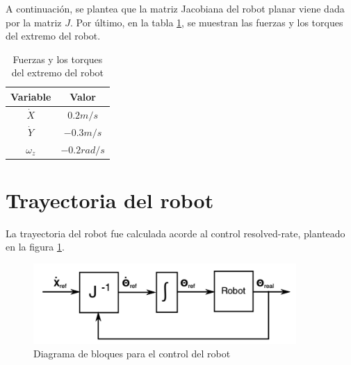 \documentclass[11pt]{report} %
\begin{document}
	A continuación, se plantea que la matriz Jacobiana del robot planar viene dada por la matriz $J$. Por último, en la tabla \ref{Tabla: Fuerzas}, se muestran las fuerzas y los torques del extremo del robot.
%



	\begin{table}[H]
		\centering
		\begin{tabular}{|c|c|}
			\hline
			\textbf{Variable}  & \textbf{Valor}  \\ \hline
			$\dot{X}$          & $0.2  m/s  $    \\ \hline
			$\dot{Y}$          & $-0.3 m/s  $    \\ \hline
			${\omega}_{z}$     & $-0.2 rad/s$    \\ \hline
		\end{tabular}
		\caption{Fuerzas y los torques del extremo del robot}
		\label{Tabla: Fuerzas}
	\end{table}

	\section{Trayectoria del robot}

	La trayectoria del robot fue calculada acorde al control resolved-rate, planteado en la figura \ref{Figura: Control}. 

	\begin{figure}[H]
		\centering
		\includegraphics[width=10cm]{Imagenes/control.png}
		\caption{Diagrama de bloques para el control del robot}
		\label{Figura: Control}
	\end{figure}
\end{document}
